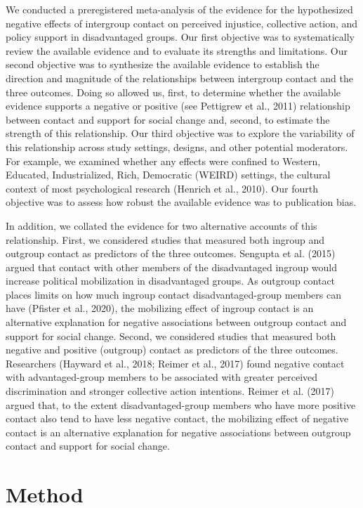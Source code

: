 \documentclass[12pt, letterpaper]{article}
\begin{document}
We conducted a preregistered meta-analysis of the evidence for the
hypothesized negative effects of intergroup contact on perceived
injustice, collective action, and policy support in disadvantaged
groups. Our first objective was to systematically review the available
evidence and to evaluate its strengths and limitations. Our second
objective was to synthesize the available evidence to establish the
direction and magnitude of the relationships between intergroup contact
and the three outcomes. Doing so allowed us, first, to determine whether
the available evidence supports a negative or positive (see Pettigrew et
al., 2011) relationship between contact and support for social change
and, second, to estimate the strength of this relationship. Our third
objective was to explore the variability of this relationship across
study settings, designs, and other potential moderators. For example, we
examined whether any effects were confined to Western, Educated,
Industrialized, Rich, Democratic (WEIRD) settings, the cultural context
of most psychological research (Henrich et al., 2010). Our fourth
objective was to assess how robust the available evidence was to
publication bias.

In addition, we collated the evidence for two alternative accounts of
this relationship. First, we considered studies that measured both
ingroup and outgroup contact as predictors of the three outcomes.
Sengupta et al. (2015) argued that contact with other members of the
disadvantaged ingroup would increase political mobilization in
disadvantaged groups. As outgroup contact places limits on how much
ingroup contact disadvantaged-group members can have (Pfister et al.,
2020), the mobilizing effect of ingroup contact is an alternative
explanation for negative associations between outgroup contact and
support for social change. Second, we considered studies that measured
both negative and positive (outgroup) contact as predictors of the three
outcomes. Researchers (Hayward et al., 2018; Reimer et al., 2017) found
negative contact with advantaged-group members to be associated with
greater perceived discrimination and stronger collective action
intentions. Reimer et al. (2017) argued that, to the extent
disadvantaged-group members who have more positive contact also tend to
have less negative contact, the mobilizing effect of negative contact is
an alternative explanation for negative associations between outgroup
contact and support for social change.

\hypertarget{method}{%
\section{Method}\label{method}}
\end{document}
